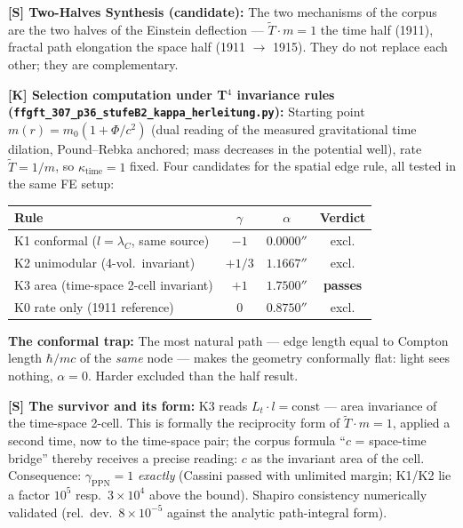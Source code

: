 \documentclass[11pt]{report}
\begin{document}
\medskip
\textbf{[S] Two-Halves Synthesis (candidate):} The two mechanisms of
the corpus are the two halves of the Einstein deflection —
$\tilde T \cdot m = 1$ the time half (1911), fractal path elongation
the space half (1911 $\to$ 1915). They do not replace each other;
they are complementary.

\medskip
\textbf{[K] Selection computation under T$^4$ invariance rules
(\texttt{ffgft\_307\_p36\_stufeB2\_kappa\_herleitung.py}):}
Starting point $m(r) = m_0(1+\Phi/c^2)$ (dual reading of the measured
gravitational time dilation, Pound--Rebka anchored; mass decreases in
the potential well), rate $\tilde T = 1/m$, so $\kappa_\text{time} = 1$
fixed. Four candidates for the spatial edge rule, all tested in the same
FE setup:

\begin{center}
\begin{tabular}{lccc}
\toprule
Rule & $\gamma$ & $\alpha$ & Verdict\\
\midrule
K1 conformal ($l = \lambda_C$, same source) & $-1$ & $0.0000''$ & excl.\\
K2 unimodular (4-vol.\ invariant)           & $+1/3$ & $1.1667''$ & excl.\\
K3 area (time-space 2-cell invariant)       & $+1$ & $1.7500''$ & \textbf{passes}\\
K0 rate only (1911 reference)               & $0$ & $0.8750''$ & excl.\\
\bottomrule
\end{tabular}
\end{center}

\textbf{The conformal trap:} The most natural path — edge length equal
to Compton length $\hbar/mc$ of the \emph{same} node — makes the geometry
conformally flat: light sees nothing, $\alpha = 0$. Harder excluded than
the half result.

\medskip
\textbf{[S] The survivor and its form:} K3 reads
$L_t \cdot l = \text{const}$ — area invariance of the time-space 2-cell.
This is formally the reciprocity form of $\tilde T \cdot m = 1$, applied
a second time, now to the time-space pair; the corpus formula ``$c$ =
space-time bridge'' thereby receives a precise reading: $c$ as the
invariant area of the cell.
Consequence: $\gamma_\text{PPN} = 1$ \emph{exactly} (Cassini passed with
unlimited margin; K1/K2 lie a factor $10^5$ resp.\ $3\times10^4$ above the
bound). Shapiro consistency numerically validated (rel.\ dev.\ $8\times10^{-5}$
against the analytic path-integral form).
\end{document}
